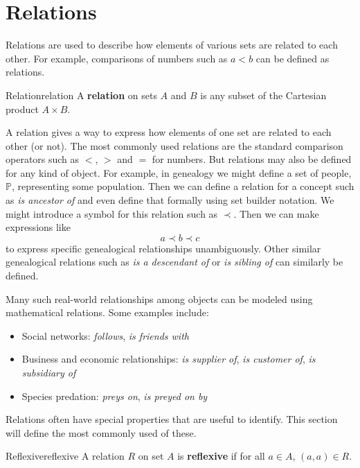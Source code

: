 \section{Relations}
Relations are used to describe how elements of various sets
are related to each other. For example, comparisons of numbers such as
\( a < b \) can be defined as relations.

\begin{definition}{Relation}{relation}
  A \textbf{relation} on sets \( A \) and \( B \) is any subset of the
  Cartesian product \( A \times B \).
\end{definition}

A relation gives a way to express how elements of one set are related to
each other (or not). The most commonly used relations are the standard
comparison operators such as \(<\), \(>\) and \(=\) for numbers. But
relations may also be defined for any kind of object. For example, in genealogy
we might define a set of people, \( \mathbb{P} \), representing some
population. Then we can define a relation for a concept such as
\textit{is ancestor of} and even define that formally using set builder
notation. We might introduce a symbol for this relation such as \( \prec \).
Then we can make expressions like
\[
  a \prec b \prec c
\]
\noindent
to express specific genealogical relationships unambiguously. Other
similar genealogical relations such as \textit{is a descendant of} or
\textit{is sibling of} can similarly be defined.

Many such real-world relationships among objects can be modeled using
mathematical relations. Some examples include:
\begin{itemize}
  \item Social networks: \textit{follows}, \textit{is friends with}
    \item Business and economic relationships: \textit{is supplier of},
      \textit{is customer of}, \textit{is subsidiary of}
    \item Species predation: \textit{preys on}, \textit{is preyed on by}
\end{itemize}

Relations often have special properties that are useful to identify. This
section will define the most commonly used of these.

\begin{definition}{Reflexive}{reflexive}
  A relation \( R \) on set \( A \) is \textbf{reflexive} if for all
  \( a \in A \), \( (a, a) \in R \).
\end{definition}

